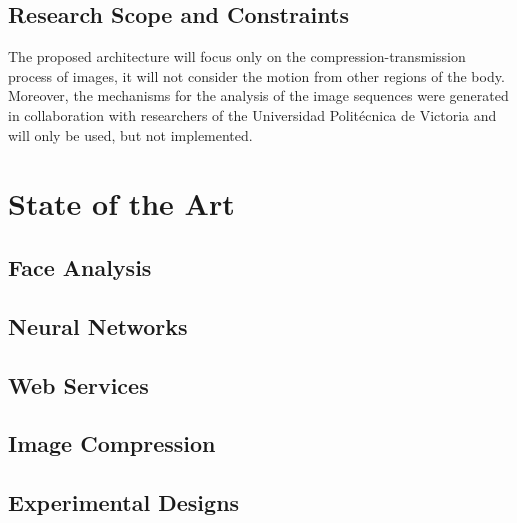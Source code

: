 \documentclass[12pt,letterpaper,titlepage]{article}
\begin{document}
\subsection{Research Scope and Constraints}
The proposed architecture will focus only on the compression-transmission process of images, it will not consider the motion from other regions of the body. Moreover, the mechanisms for the analysis of the image sequences were generated in collaboration with researchers of the Universidad Polit\'ecnica de Victoria and will only be used, but not implemented.


\newpage
\section{State of the Art}
\subsection{Face Analysis}
	
\subsection{Neural Networks}
	
\subsection{Web Services}
	
\subsection{Image Compression}
	
\subsection{Experimental Designs}
	

\clearpage
\end{document}
